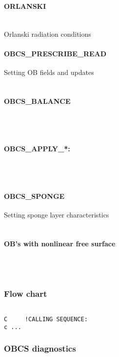 \paragraph{ORLANSKI} ~ \\
%
Orlanski radiation conditions

\paragraph{OBCS\_PRESCRIBE\_READ} Setting OB fields and updates \\
%
~

\paragraph{OBCS\_BALANCE} ~ \\
%
~

\paragraph{OBCS\_APPLY\_*:} ~ \\
~

\paragraph{OBCS\_SPONGE} Setting sponge layer characteristics \\
%
~

\paragraph{OB's with nonlinear free surface} ~ \\
%
~



\subsubsection{Flow chart
\label{sec:pkg:obcs:flowchart}}


{\footnotesize
\begin{verbatim}

C     !CALLING SEQUENCE:
c ...

\end{verbatim}
}


\subsubsection{OBCS diagnostics
\label{sec:pkg:obcs:diagnostics}}

